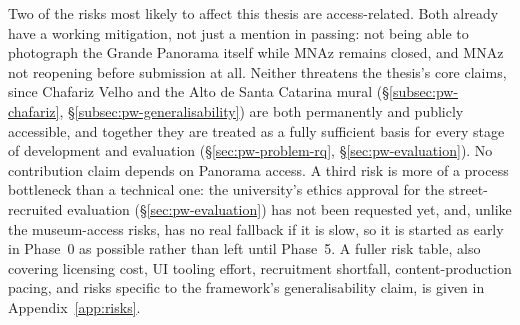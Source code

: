 Two of the risks most likely to affect this thesis are access-related.
Both already have a working mitigation, not just a mention in passing:
not being able to photograph the Grande Panorama itself while MNAz
remains closed, and MNAz not reopening before submission at all. Neither
threatens the thesis's core claims, since Chafariz Velho and the Alto de
Santa Catarina mural (\S\ref{subsec:pw-chafariz},
\S\ref{subsec:pw-generalisability}) are both permanently and publicly
accessible, and together they are treated as a fully sufficient basis for
every stage of development and evaluation (\S\ref{sec:pw-problem-rq},
\S\ref{sec:pw-evaluation}). No contribution claim depends on Panorama
access. A third risk is more of a process bottleneck than a technical
one: the university's ethics approval for the street-recruited evaluation
(\S\ref{sec:pw-evaluation}) has not been requested yet, and, unlike the
museum-access risks, has no real fallback if it is slow, so it is
started as early in Phase~0 as possible rather than left until
Phase~5. A fuller risk table, also covering licensing cost, UI tooling
effort, recruitment shortfall, content-production pacing, and risks
specific to the framework's generalisability claim, is given in
Appendix~\ref{app:risks}.